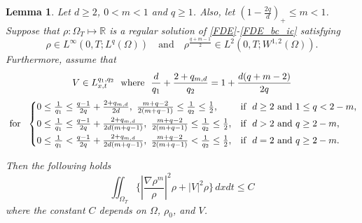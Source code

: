 \documentclass{amsart}
\newtheorem{lemma}[defn]{Lemma}
\numberwithin{equation}{section}
\newcommand{\calC}{{ \mathcal C  }}
\newcommand{\abs}[1]{\left| #1 \right|}
\begin{document}
\begin{lemma}\label{L:speed}
	Let $d\geq 2$, $0<m<1$ and $q\geq 1$. Also, let $(1-\frac{2q}{d})_{+} \leq m<1$. Suppose that $\rho:\Omega_{T} \mapsto \mathbb{R}$ is a regular solution of \eqref{FDE}-\eqref{FDE_bc_ic} satisfying 
	 \begin{equation}\label{FS}
 \rho \in L^{\infty}(0, T; L^{q}(\Omega)) \quad \text{and} \quad
 \rho^{\frac{q+m-1}{2}} \in L^{2}(0, T; W^{1,2}(\Omega)).
 \end{equation}
 Furthermore, assume that 
  \begin{equation}\label{V:speed}
  \begin{gathered}
  V\in L_{x,t}^{q_1, q_2}  \ \text{ where } \
  \frac{d}{q_1} + \frac{2 + q_{m,d}}{q_2} = 1+\frac{d(q+m-2)}{2q} \vspace{1 mm}\\
\text{ for } \ 
\begin{cases}
0 \leq \frac{1}{q_1} \leq \frac{q-1}{2q}+\frac{2+q_{m,d}}{2d}, \ \frac{m+q-2}{2(m+q-1)} \leq \frac{1}{q_2} \leq \frac{1}{2}, &\text{if } \  d\geq 2  \text{ and }  1\leq q<2-m,
\vspace{1mm}\\
0 \leq \frac{1}{q_1} \leq \frac{q-1}{2q}+\frac{2+q_{m,d}}{2d(m+q-1)},\ \frac{m+q-2}{2(m+q-1)} \leq \frac{1}{q_2} \leq \frac{1}{2}, &\text{if }\  d>2 \text{ and } q \geq 2-m,  \vspace{1 mm} \\
0 \leq \frac{1}{q_1} < \frac{q-1}{2q}+\frac{2+q_{m,d}}{2d(m+q-1)}, \ \frac{m+q-2}{2(m+q-1)} < \frac{1}{q_2} \leq \frac{1}{2}, &\text{if } \  d=2 \text{ and } q \geq 2-m.  
\end{cases}
 \end{gathered}
 \end{equation}
 
 Then the following holds
 \begin{equation*}
 	\iint_{\Omega_{T}} \{ \abs{\frac{\nabla \rho^m}{\rho}}^2 \rho + \abs{V}^2\rho \} \,dxdt \leq C
\end{equation*}
where the constant $C$ depends on $\Omega$, $\rho_0$, and $V$. 
\end{lemma}
\end{document}
